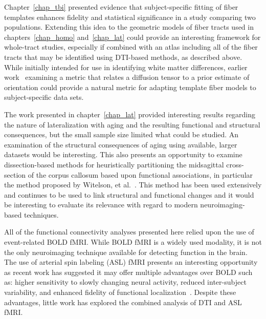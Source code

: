 Chapter~\ref{chap_tbi} presented evidence that subject-specific fitting of fiber templates enhances fidelity and statistical significance in a study comparing two populations. Extending this idea to the geometric models of fiber tracts used in chapters~\ref{chap_homo} and~\ref{chap_lat} could provide an interesting framework for whole-tract studies, especially if combined with an atlas including all of the fiber tracts that may be identified using DTI-based methods, as described above. While initially intended for use in identifying white matter differences, earlier work~\cite{duda08miccai} examining a metric that relates a diffusion tensor to a prior estimate of orientation could provide a natural metric for adapting template fiber models to subject-specific data sets.

The work presented in chapter~\ref{chap_lat} provided interesting results regarding the nature of lateralization with aging and the resulting functional and structural consequences, but the small sample size limited what could be studied. An examination of the structural consequences of aging using available, larger datasets would be interesting. This also presents an opportunity to examine dissection-based methods for heuristically partitioning the midsagittal cross-section of the corpus callosum based upon functional associations, in particular the method proposed by Witelson, et al.\ \cite{Witelson1989}. This method has been used extensively and continues to be used to link structural and functional changes and it would be interesting to evaluate its relevance with regard to modern neuroimaging-based techniques.

All of the functional connectivity analyses presented here relied upon the use of event-related BOLD fMRI. While BOLD fMRI is a widely used modality, it is not the only neuroimaging technique available for detecting function in the brain. The use of arterial spin labeling (ASL) fMRI presents an interesting opportunity as recent work has suggested it may offer multiple advantages over BOLD such as: higher sensitivity to slowly changing neural activity, reduced inter-subject variability, and enhanced fidelity of functional localization~\cite{Detre2002}. Despite these advantages, little work has explored the combined analysis of DTI and ASL fMRI.



%
%
%
%
%
%




